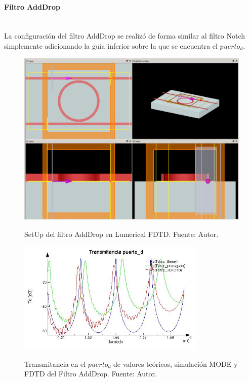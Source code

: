\paragraph{Filtro AddDrop}~\\
La configuración del filtro AddDrop se realizó de forma similar al filtro Notch 
simplemente adicionando la guía inferior sobre la que se encuentra el $puerto_d$. 

\begin{figure}[H]
\caption{SetUp del filtro AddDrop en Lumerical FDTD. Fuente: Autor.}
\centering
\includegraphics[width=1.0\textwidth,natwidth=1074,natheight=808]{figs/lum_setup_ad.PNG}
\label{fig:lum_setup_ad}
\end{figure} 

\begin{figure}[H]
\caption{Transmitancia en el $puerto_d$ de valores teóricos, simulación MODE y 
FDTD del Filtro AddDrop. Fuente: Autor.}
\centering
\includegraphics[width=0.8\textwidth,natwidth=593,natheight=356]{figs/lum_Td.jpg}
\label{fig:lum_td_ad}
\end{figure} 

